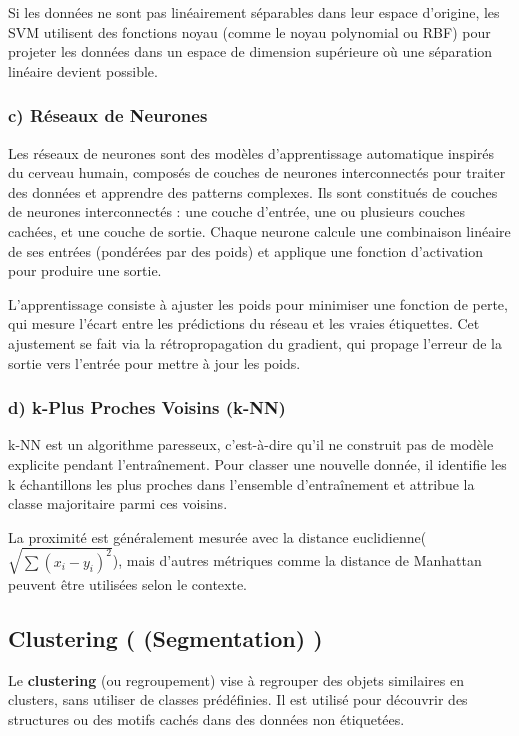 \documentclass[a4paper,12pt]{report}
\begin{document}
Si les données ne sont pas linéairement séparables dans leur espace d’origine, les SVM utilisent des fonctions noyau (comme le noyau polynomial ou RBF) pour projeter les données dans un espace de dimension supérieure où une séparation linéaire devient possible.
        
        \subsubsection*{c) Réseaux de Neurones}
        Les réseaux de neurones sont des modèles d’apprentissage automatique inspirés du cerveau humain, composés de couches de neurones interconnectés pour traiter des données et apprendre des patterns complexes.
        Ils sont constitués de couches de neurones interconnectés : une couche d’entrée, une ou plusieurs couches cachées, et une couche de sortie. Chaque neurone calcule une combinaison linéaire de ses entrées (pondérées par des poids) et applique une fonction d’activation pour produire une sortie.

L’apprentissage consiste à ajuster les poids pour minimiser une fonction de perte, qui mesure l’écart entre les prédictions du réseau et les vraies étiquettes. Cet ajustement se fait via la rétropropagation du gradient, qui propage l’erreur de la sortie vers l’entrée pour mettre à jour les poids.
        
        \subsubsection*{d) k-Plus Proches Voisins (k-NN)}
        k-NN est un algorithme paresseux, c’est-à-dire qu’il ne construit pas de modèle explicite pendant l’entraînement. Pour classer une nouvelle donnée, il identifie les k échantillons les plus proches dans l’ensemble d’entraînement et attribue la classe majoritaire parmi ces voisins.

La proximité est généralement mesurée avec la distance euclidienne(\( \sqrt{\sum (x_i - y_i)^2} \)), mais d’autres métriques comme la distance de Manhattan peuvent être utilisées selon le contexte.

        \subsection{Clustering ( (Segmentation) )}
        
        Le \textbf{clustering} (ou regroupement) vise à regrouper des objets similaires en clusters, sans utiliser de classes prédéfinies. Il est utilisé pour découvrir des structures ou des motifs cachés dans des données non étiquetées.
        
\end{document}

